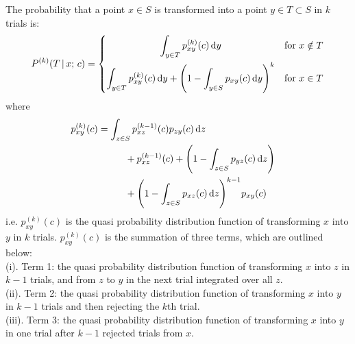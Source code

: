 \begin{definition}
The probability that a point $x \in S$ is transformed into a point $y \in T \subset S$ in $k$ trials is:\\
\begin{equation}
    P^{(k)}(T \, | \, x; \, c) = \begin{dcases}
        \hfil \int_{y \in T} p^{(k)}_{xy}(c) \, \dd y & \text{for } x \notin T \\
        \int_{y \in T} p^{(k)}_{xy}(c) \, \dd y + \Bigg( 1 - \int_{y \in S} p_{xy}(c) \, \dd y \Bigg)^{k} & \text{for } x \in T \\
    \end{dcases}
\end{equation}
where
\begin{align}
    p^{(k)}_{xy}(c) &=\int_{z \in S} p^{(k-1)}_{xz}(c)p_{zy}(c) \, \dd z & \notag \\
    & \hspace{10mm} +p^{(k-1)}_{xz}(c) + \Bigg( 1 - \int_{z \in S} p_{yz}(c) \, \dd z \Bigg) & \notag \\
    & \hspace{10mm} + \Bigg( 1 - \int_{z \in S} p_{xz}(c) \, \dd z \Bigg)^{k-1}p_{xy}(c) 
\end{align}
i.e. $p^{(k)}_{xy}(c)$ is the quasi probability distribution function of transforming $x$ into $y$ in $k$ trials. $p^{(k)}_{xy}(c)$ is the summation of three terms, which are outlined below:\\
(i). Term 1: the quasi probability distribution function of transforming $x$ into $z$ in $k-1$ trials, and from $z$ to $y$ in the next trial integrated over all $z$. \\
(ii). Term 2: the quasi probability distribution function of transforming $x$ into $y$ in $k-1$ trials and then rejecting the $k$th trial. \\
(iii). Term 3: the quasi probability distribution function of transforming $x$ into $y$ in one trial after $k-1$ rejected trials from $x$.









\end{definition}


